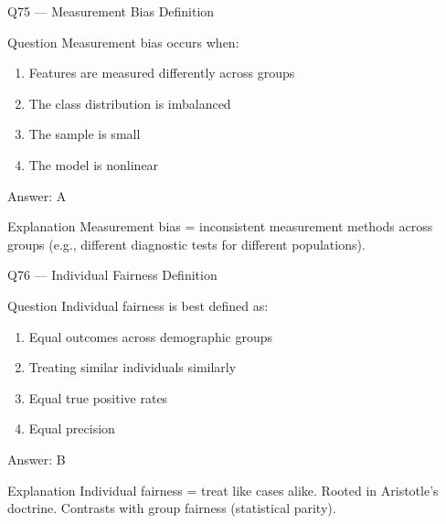 \documentclass[aspectratio=169,8pt]{beamer}
\begin{document}
	\begin{frame}{Q75 --- Measurement Bias Definition}
		\begin{block}{Question}
			Measurement bias occurs when:
			\begin{enumerate}
				\item Features are measured differently across groups
				\item The class distribution is imbalanced
				\item The sample is small
				\item The model is nonlinear
			\end{enumerate}
		\end{block}
		\begin{exampleblock}{Answer: A}\end{exampleblock}
		\begin{block}{Explanation}
			Measurement bias = inconsistent measurement methods across groups (e.g., different diagnostic tests for different populations).
		\end{block}
	\end{frame}
	
	\begin{frame}{Q76 --- Individual Fairness Definition}
		\begin{block}{Question}
			Individual fairness is best defined as:
			\begin{enumerate}
				\item Equal outcomes across demographic groups
				\item Treating similar individuals similarly
				\item Equal true positive rates
				\item Equal precision
			\end{enumerate}
		\end{block}
		\begin{exampleblock}{Answer: B}\end{exampleblock}
		\begin{block}{Explanation}
			Individual fairness = treat like cases alike. Rooted in Aristotle's doctrine. Contrasts with group fairness (statistical parity).
		\end{block}
	\end{frame}
	
\end{document}
